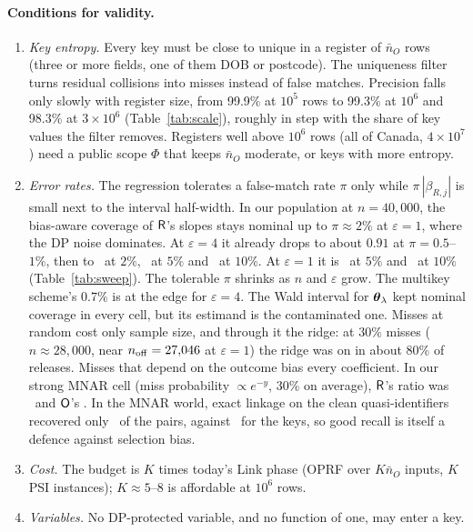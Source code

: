 \paragraph{Conditions for validity.}
\begin{enumerate}
\item \emph{Key entropy.} Every key must be close to unique in a register of $\bar n_O$ rows (three or more fields, one of them DOB or postcode). The uniqueness filter turns residual collisions into misses instead of false matches. Precision falls only slowly with register size, from 99.9\% at $10^5$ rows to 99.3\% at $10^6$ and 98.3\% at $3\times10^6$ (Table~\ref{tab:scale}), roughly in step with the share of key values the filter removes. Registers well above $10^6$ rows (all of Canada, $4\times10^7$) need a public scope $\Phi$ that keeps $\bar n_O$ moderate, or keys with more entropy.
\item \emph{Error rates.} The regression tolerates a false-match rate $\pi$ only while $\pi\,|\beta_{R,j}|$ is small next to the interval half-width. In our population at $n=40{,}000$, the bias-aware coverage of $\mathsf{R}$'s slopes stays nominal up to $\pi\approx2\%$ at $\varepsilon=1$, where the DP noise dominates. At $\varepsilon=4$ it already drops to about $0.91$ at $\pi=0.5$--$1\%$, then to \SwCovRfourTwo\ at $2\%$, \SwCovRfourFive\ at $5\%$ and \SwCovRfourTen\ at $10\%$. At $\varepsilon=1$ it is \SwCovRoneFive\ at $5\%$ and \SwCovRoneTen\ at $10\%$ (Table~\ref{tab:sweep}). The tolerable $\pi$ shrinks as $n$ and $\varepsilon$ grow. The multikey scheme's $0.7\%$ is at the edge for $\varepsilon=4$. The Wald interval for $\boldsymbol\theta_\lambda$ kept nominal coverage in every cell, but its estimand is the contaminated one. Misses at random cost only sample size, and through it the ridge: at $30\%$ misses ($n\approx28{,}000$, near $n_{\mathrm{off}}=27{,}046$ at $\varepsilon=1$) the ridge was on in about 80\% of releases. Misses that depend on the outcome bias every coefficient. In our strong MNAR cell (miss probability $\propto e^{-y}$, 30\% on average), $\mathsf{R}$'s ratio was \SwMNARratio\ and $\mathsf{O}$'s \SwMNARratioO. In the MNAR world, exact linkage on the clean quasi-identifiers recovered only \EXrecMNAR\ of the pairs, against \MKrecMNAR\ for the keys, so good recall is itself a defence against selection bias.
\item \emph{Cost.} The budget is $K$ times today's Link phase (OPRF over $K\bar n_O$ inputs, $K$ PSI instances); $K\approx5$--$8$ is affordable at $10^6$ rows.
\item \emph{Variables.} No DP-protected variable, and no function of one, may enter a key.
\end{enumerate}

